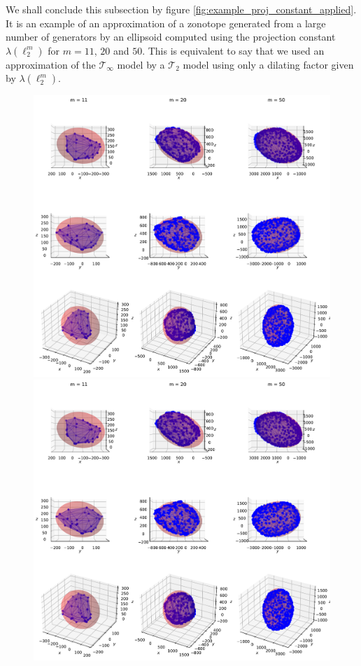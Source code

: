We shall conclude this subsection by figure \ref{fig:example_proj_constant_applied}. It is an example of an approximation of a zonotope generated from a large number of generators by an ellipsoid computed using the projection constant $\lambda(\ell_2^{m})$ for $m=11$, $20$ and $50$. This is equivalent to say that we used an approximation of the $\mathcal{T}_{\infty}$ model by a $\mathcal{T}_2$ model using only a dilating factor given by $\lambda(\ell_2^{m})$. 


\begin{figure}[!htb]
    \captionsetup{justification=centering}
    \begin{minipage}{1\linewidth}
        \centering
        \includegraphics[trim={0 700 0 0},clip, width=0.9\linewidth]{img/chapter_3/myIma5_projection_constant.pdf}
    \end{minipage}
    \begin{minipage}{1\linewidth}
        \centering
        \includegraphics[trim={0 500 0 60},clip, width=0.9\linewidth]{img/chapter_3/myIma5_projection_constant.pdf}

\end{minipage}
\end{figure}
